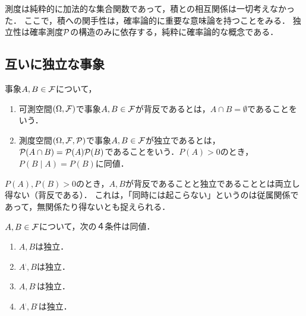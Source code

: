 \documentclass[uplatex,dvipdfmx]{jsreport}
\begin{document}
\begin{tcolorbox}[colframe=ForestGreen, colback=ForestGreen!10!white,breakable,colbacktitle=ForestGreen!40!white,coltitle=black,fonttitle=\bfseries\sffamily,
title=積への関手性]
    測度は純粋的に加法的な集合関数であって，積との相互関係は一切考えなかった．
    ここで，積への関手性は，確率論的に重要な意味論を持つことをみる．
    独立性は確率測度$\P$の構造のみに依存する，純粋に確率論的な概念である．
\end{tcolorbox}

\subsection{互いに独立な事象}

\begin{definition}[independent]
    事象$A,B\in\calF$について，
    \begin{enumerate}
        \item 可測空間$(\Omega,\calF)$で事象$A,B\in\calF$が背反であるとは，$A\cap B=\emptyset$であることをいう．
        \item 測度空間$(\Omega,\calF,\P)$で事象$A,B\in\calF$が独立であるとは，$\P(A\cap B)=\P(A)\P(B)$であることをいう．$P(A)>0$のとき，$P(B\mid A)=P(B)$に同値．
    \end{enumerate}
\end{definition}
\begin{remark}
    $P(A),P(B)>0$のとき，$A,B$が背反であることと独立であることとは両立し得ない（背反である）．
    これは，「同時には起こらない」というのは従属関係であって，無関係たり得ないとも捉えられる．
\end{remark}

\begin{lemma}[補集合演算に関する関手性]
    $A,B\in\F$について，次の４条件は同値．
    \begin{enumerate}
        \item $A,B$は独立．
        \item $A^\comp,B$は独立．
        \item $A,B^\comp$は独立．
        \item $A^\comp,B^\comp$は独立．
    \end{enumerate}
\end{lemma}
\end{document}
